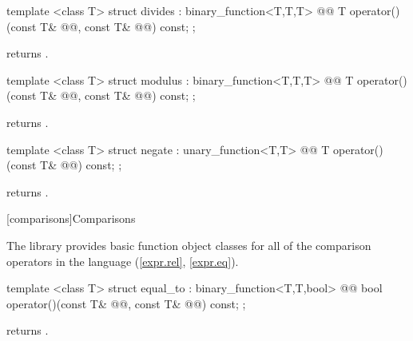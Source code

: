 \documentclass[american,twoside]{book}
\begin{document}
%
\begin{itemdecl}
template <class T> struct divides : binary_function<T,T,T> {
  @@
  T operator()(const T& @@, const T& @@) const;
};
\end{itemdecl}

\begin{itemdescr}
\pnum
{}
returns
.
\end{itemdescr}

%
\begin{itemdecl}
template <class T> struct modulus : binary_function<T,T,T> {
  @@
    T operator()(const T& @@, const T& @@) const;
};
\end{itemdecl}

\begin{itemdescr}
\pnum
{} returns .
\end{itemdescr}

%
\begin{itemdecl}
template <class T> struct negate : unary_function<T,T> {
  @@
    T operator()(const T& @@) const;
};
\end{itemdecl}

\begin{itemdescr}
\pnum
{} returns .
\end{itemdescr}

[comparisons]{Comparisons}

\pnum
The library provides basic function object classes for all of the comparison
operators in the language (\ref{expr.rel}, \ref{expr.eq}).

%
\begin{itemdecl}
template <class T> struct equal_to : binary_function<T,T,bool> {
  @@
    bool operator()(const T& @@, const T& @@) const;
};
\end{itemdecl}

\begin{itemdescr}
\pnum
{} returns .
\end{itemdescr}
\end{document}
